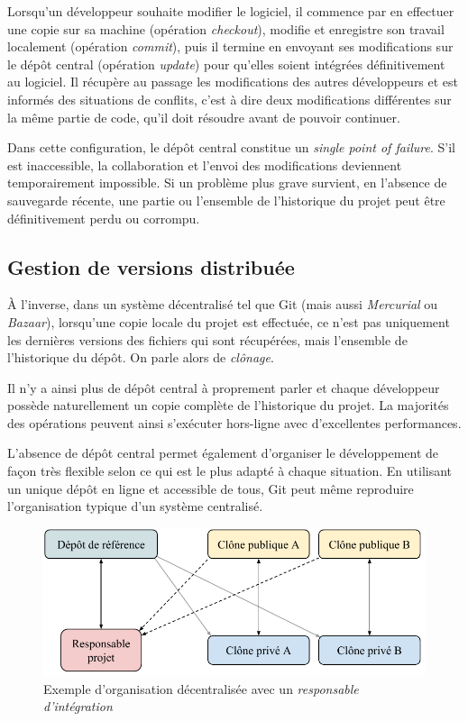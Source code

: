 \documentclass[11pt,a4paper]{article}
\begin{document}
Lorsqu'un développeur souhaite modifier le logiciel, il commence par en effectuer une copie sur sa machine (opération \textit{checkout}), modifie et enregistre son travail localement (opération \textit{commit}), puis il termine en envoyant ses modifications sur le dépôt central (opération \textit{update}) pour qu'elles soient intégrées définitivement au logiciel.
Il récupère au passage les modifications des autres développeurs et est informés des situations de conflits, c'est à dire deux modifications différentes sur la même partie de code, qu'il doit résoudre avant de pouvoir continuer.

Dans cette configuration, le dépôt central constitue un \textit{single point of failure}.
S'il est inaccessible, la collaboration et l'envoi des modifications deviennent temporairement impossible.
Si un problème plus grave survient, en l'absence de sauvegarde récente, une partie ou l'ensemble de l'historique du projet peut être définitivement perdu ou corrompu.

\subsection{Gestion de versions distribuée}

À l'inverse, dans un système décentralisé tel que Git (mais aussi \textit{Mercurial} ou \textit{Bazaar}), lorsqu'une copie locale du projet est effectuée, ce n'est pas uniquement les dernières versions des fichiers qui sont récupérées, mais l'ensemble de l'historique du dépôt.
On parle alors de \textit{clônage}.

Il n'y a ainsi plus de dépôt central à proprement parler et chaque développeur possède naturellement un copie complète de l'historique du projet.
La majorités des opérations peuvent ainsi s'exécuter hors-ligne avec d'excellentes performances.

L'absence de dépôt central permet également d'organiser le développement de façon très flexible selon ce qui est le plus adapté à chaque situation.
En utilisant un unique dépôt en ligne et accessible de tous, Git peut même reproduire l'organisation typique d'un système centralisé.

\begin{figure}[ht]
\begin{center}
\includegraphics[width=11.5cm]{img_dvcs}
\caption{Exemple d'organisation décentralisée avec un \textit{responsable d'intégration}}
\end{center}
\end{figure}
\end{document}
